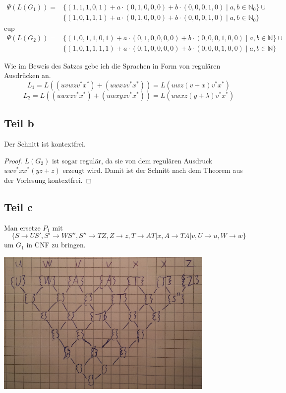 \documentclass[10pt,a4paper]{article}
\begin{document}
\begin{align*}
  \Psi(L(G_{1})) = & \{ (1, 1, 1, 0, 1) + a \cdot (0, 1, 0, 0, 0) + b \cdot (0, 0, 0, 1, 0) \mid a, b \in \mathbb{N}_{0} \} \cup\\
  & \{ (1, 0, 1, 1, 1) + a \cdot (0, 1, 0, 0, 0) + b \cdot (0, 0, 0, 1, 0) \mid a, b \in \mathbb{N}_{0} \}
\end{align*}
cup\begin{align*}
  \Psi(L(G_{2})) = & \{ (1, 0, 1, 1, 0, 1) + a \cdot (0, 1, 0, 0, 0, 0) + b \cdot (0, 0, 0, 1, 0, 0) \mid a, b \in \mathbb{N} \} \cup\\
  & \{ (1, 0, 1, 1, 1, 1) + a \cdot (0, 1, 0, 0, 0, 0) + b \cdot (0, 0, 0, 1, 0, 0) \mid a, b \in \mathbb{N} \}
\end{align*}

Wie im Beweis des Satzes gebe ich die Sprachen in Form von regulären Ausdrücken an.
\begin{equation}
  L_{1} = L((uvwzv^{*}x^{*}) + (uwxzv^{*}x^{*})) = L(uwz(v + x)v^{*}x^{*})
\end{equation}
\begin{equation}
  L_{2} = L((uwxzv^{*}x^{*}) + (uwxyzv^{*}x^{*})) = L(uwxz(y + \lambda)v^{*}x^{*})
\end{equation}

\subsection{Teil b}

Der Schnitt ist kontextfrei.

\begin{proof}
  $L(G_{2})$ ist sogar regulär, da sie von dem regulären Ausdruck $uwv^{*}xx^{*}(yz + z)$ erzeugt wird.
  Damit ist der Schnitt nach dem Theorem aus der Vorlesung kontextfrei.
\end{proof}

\subsection{Teil c}

Man ersetze $P_{1}$ mit
\begin{equation}
  \{ S \rightarrow US', S' \rightarrow WS'', S'' \rightarrow TZ, Z \rightarrow z, T \rightarrow AT | x, A \rightarrow TA | v, U \rightarrow u, W \rightarrow w \}
\end{equation}
um $G_{1}$ in CNF zu bringen.

\includegraphics[width=300pt]{6_4_c_1.png}
\end{document}
